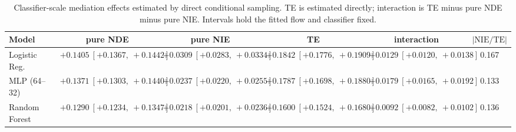 \begin{table}[htbp]
  \centering
  \caption{Classifier-scale mediation effects estimated by direct conditional sampling. TE is estimated directly; interaction is TE minus pure NDE minus pure NIE. Intervals hold the fitted flow and classifier fixed.}
  \label{tab:adult_gap_overall}
  \begin{tabular}{lccccc}
    \toprule
    Model & pure NDE & pure NIE & TE & interaction & $|\mathrm{NIE}/\mathrm{TE}|$ \\
    \midrule
    Logistic Reg. & $+0.1405\ [+0.1367,\ +0.1442]$ & $+0.0309\ [+0.0283,\ +0.0334]$ & $+0.1842\ [+0.1776,\ +0.1909]$ & $+0.0129\ [+0.0120,\ +0.0138]$ & 0.167 \\
    MLP (64--32) & $+0.1371\ [+0.1303,\ +0.1440]$ & $+0.0237\ [+0.0220,\ +0.0255]$ & $+0.1787\ [+0.1698,\ +0.1880]$ & $+0.0179\ [+0.0165,\ +0.0192]$ & 0.133 \\
    Random Forest & $+0.1290\ [+0.1234,\ +0.1347]$ & $+0.0218\ [+0.0201,\ +0.0236]$ & $+0.1600\ [+0.1524,\ +0.1680]$ & $+0.0092\ [+0.0082,\ +0.0102]$ & 0.136 \\
    \bottomrule
  \end{tabular}
\end{table}